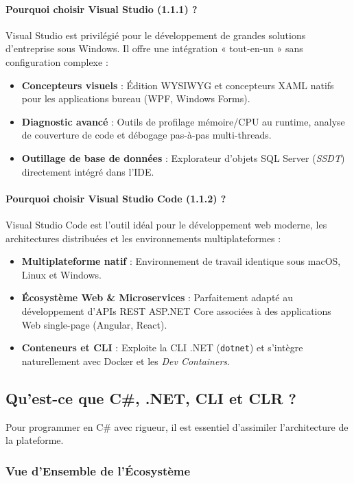 \paragraph{Pourquoi choisir Visual Studio (1.1.1) ?}
Visual Studio est privilégié pour le développement de grandes solutions d'entreprise sous Windows. Il offre une intégration « tout-en-un » sans configuration complexe :
\begin{itemize}
    \item \textbf{Concepteurs visuels} : Édition WYSIWYG et concepteurs XAML natifs pour les applications bureau (WPF, Windows Forms).
    \item \textbf{Diagnostic avancé} : Outils de profilage mémoire/CPU au runtime, analyse de couverture de code et débogage pas-à-pas multi-threads.
    \item \textbf{Outillage de base de données} : Explorateur d'objets SQL Server (\emph{SSDT}) directement intégré dans l'IDE.
\end{itemize}

\paragraph{Pourquoi choisir Visual Studio Code (1.1.2) ?}
Visual Studio Code est l'outil idéal pour le développement web moderne, les architectures distribuées et les environnements multiplateformes :
\begin{itemize}
    \item \textbf{Multiplateforme natif} : Environnement de travail identique sous macOS, Linux et Windows.
    \item \textbf{Écosystème Web \& Microservices} : Parfaitement adapté au développement d'APIs REST ASP.NET Core associées à des applications Web single-page (Angular, React).
    \item \textbf{Conteneurs et CLI} : Exploite la CLI .NET (\texttt{dotnet}) et s'intègre naturellement avec Docker et les \emph{Dev Containers}.
\end{itemize}

\subsection{Qu'est-ce que C\#, .NET, CLI et CLR ?}

Pour programmer en C\# avec rigueur, il est essentiel d'assimiler l'architecture de la plateforme.

\subsubsection{Vue d'Ensemble de l'Écosystème}

